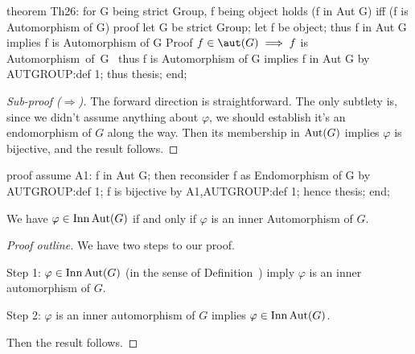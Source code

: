 \nwenddocs{}\endmoddef\nwstartdeflinemarkup{}\nwenddeflinemarkup
theorem Th26:
  for G being strict Group, f being object
  holds (f in Aut G) iff (f is Automorphism of G)
proof
  let G be strict Group;
  let f be object;
  thus f in Aut G implies f is Automorphism of G
  \LA{}Proof $f\in\aut(G)\implies f$ is \code{}Automorphism\ of\ G\edoc{}~{\nwtagstyle{}}\RA{}
  thus f is Automorphism of G implies f in Aut G by AUTGROUP:def 1;
  thus thesis;
end;
\eatline
{}\nwendcode{}\nwdocspar
\begin{proof}[Sub-proof ($\Longrightarrow$)]
The forward direction is
straightforward. The only subtlety is, since we didn't assume anything
about $\varphi$, we should establish it's an endomorphism of $G$ along
the way. Then its membership in $\operatorname{Aut}(G)$ implies $\varphi$ is
bijective, and the result follows.
\end{proof}

\nwenddocs{}\endmoddef\nwstartdeflinemarkup{}\nwenddeflinemarkup
proof
  assume A1: f in Aut G;
  then reconsider f as Endomorphism of G by AUTGROUP:def 1;
  f is bijective by A1,AUTGROUP:def 1;
  hence thesis;
end;
\nwendcode{}\nwdocspar


\begin{theorem}
We have $\varphi\in\operatorname{Inn}\operatorname{Aut}(G)$ if and only if $\varphi$ is an inner
Automorphism of $G$.
\end{theorem}

\begin{proof}[Proof outline]
  We have two steps to our proof.

  Step 1: $\varphi\in\operatorname{Inn}\operatorname{Aut}(G)$ (in the sense of Definition~)
  imply $\varphi$ is an inner automorphism of $G$.

  Step 2: $\varphi$ is an inner automorphism of $G$ implies $\varphi\in\operatorname{Inn}\operatorname{Aut}(G)$.

  Then the result follows.
\end{proof}

